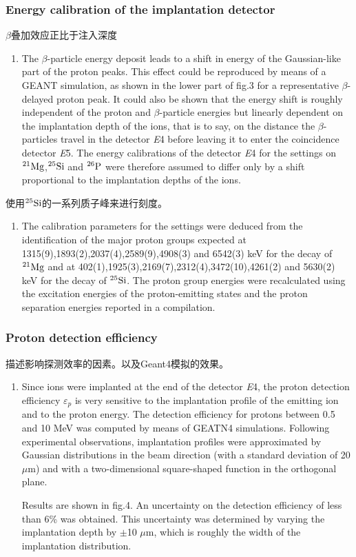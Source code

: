 \documentclass[a4paper]{article}
\begin{document}
\subsubsection{Energy calibration of the implantation detector}
$\beta$叠加效应正比于注入深度
\begin{enumerate}
    \item The $\beta$-particle energy deposit leads to a shift in energy of the Gaussian-like part of the proton peaks. This effect could be reproduced by means of a GEANT simulation, as shown in the lower part of fig.3 for a representative $\beta$-delayed proton peak. It could also be shown that the energy shift is roughly independent of the proton and $\beta$-particle energies but linearly dependent on the implantation depth of the ions, that is to say, on the distance the $\beta$-particles travel in the detector \textit{E}4 before leaving it to enter the coincidence detector \textit{E}5. The energy calibrations of the detector \textit{E}4 for the settings on $^{21}\textnormal{Mg}$,$^{25}\textnormal{Si}$ and $^{26}\textnormal{P}$ were therefore assumed to differ only by a shift proportional to the implantation depths of the ions.
\end{enumerate}

使用$^{25}\textnormal{Si}$的一系列质子峰来进行刻度。
\begin{enumerate}
    \item The calibration parameters for the settings were deduced from the identification of the major proton groups expected at 1315(9),1893(2),2037(4),2589(9),4908(3) and 6542(3) keV for the decay of $^{21}\textnormal{Mg}$ and at 402(1),1925(3),2169(7),2312(4),3472(10),4261(2) and 5630(2) keV for the decay of $^{25}\textnormal{Si}$. The proton group energies were recalculated using the excitation energies of the proton-emitting states and the proton separation energies reported in a compilation.
\end{enumerate}

\subsubsection{Proton detection efficiency}
描述影响探测效率的因素。以及Geant4模拟的效果。

\begin{enumerate}
    \item Since ions were implanted at the end of the detector \textit{E}4, the proton detection efficiency $\varepsilon_{p}$ is very sensitive to the implantation profile of the emitting ion and to the proton energy. The detection efficiency for protons between 0.5 and 10 MeV was computed by means of GEATN4 simulations. Following experimental observations, implantation profiles were approximated by Gaussian distributions in the beam direction (with a standard deviation of 20 $\mu$m) and with a two-dimensional square-shaped function in the orthogonal plane. 
    
    Results are shown in fig.4. An uncertainty on the detection efficiency of less than 6\% was obtained. This uncertainty was determined by varying the implantation depth by $\pm$10 $\mu$m, which is roughly the width of the implantation distribution.
\end{enumerate}
\end{document}
